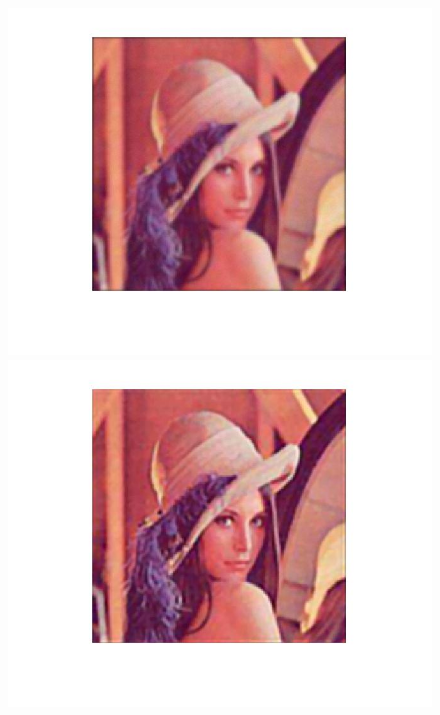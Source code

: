 \documentclass{article}
\theoremstyle{plain} \newtheorem{thm}{Theorem}
\begin{document}
\begin{figure}
\begin{minipage}{.5\linewidth}
		\includegraphics[width=\textwidth]{classic_blurred.jpg}
	\end{minipage}
	\begin{minipage}{.5\linewidth}
		\includegraphics[width=\linewidth]{classic_recovered.jpg}
	\end{minipage}
	\begin{minipage}{.5\linewidth}

\end{minipage}
\end{figure}
\end{document}
